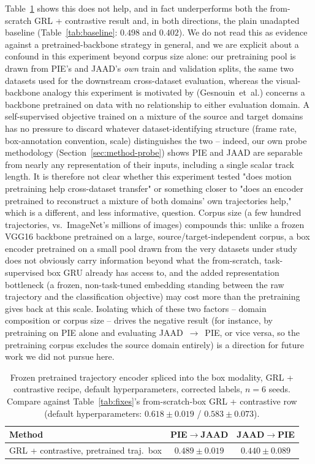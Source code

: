 Table~\ref{tab:pretrained-traj} shows this does not help, and in fact
underperforms both the from-scratch GRL + contrastive result and, in
both directions, the plain unadapted baseline
(Table~\ref{tab:baseline}: $0.498$ and $0.402$). We do not read this as
evidence against a pretrained-backbone strategy in general, and we are
explicit about a confound in this experiment beyond corpus size alone:
our pretraining pool is drawn from PIE's and JAAD's \emph{own} train
and validation splits, the same two datasets used for the downstream
cross-dataset evaluation, whereas the visual-backbone analogy this
experiment is motivated by (Gesnouin~et~al.) concerns a backbone
pretrained on data with no relationship to either evaluation
domain. A self-supervised objective trained on a mixture of the source
and target domains has no pressure to discard whatever
dataset-identifying structure (frame rate, box-annotation convention,
scale) distinguishes the two -- indeed, our own probe methodology
(Section~\ref{sec:method-probe}) shows PIE and JAAD are separable from
nearly any representation of their inputs, including a single scalar
track length. It is therefore not clear whether this experiment tested
"does motion pretraining help cross-dataset transfer" or something
closer to "does an encoder pretrained to reconstruct a mixture of both
domains' own trajectories help," which is a different, and less
informative, question. Corpus size (a few hundred trajectories, vs.\
ImageNet's millions of images) compounds this: unlike a frozen VGG16
backbone pretrained on a large, source/target-independent corpus, a box
encoder pretrained on a small pool drawn from the very datasets under
study does not obviously carry information beyond what the
from-scratch, task-supervised box GRU already has access to, and the
added representation bottleneck (a frozen, non-task-tuned embedding
standing between the raw trajectory and the classification objective)
may cost more than the pretraining gives back at this scale. Isolating
which of these two factors -- domain composition or corpus size --
drives the negative result (for instance, by pretraining on PIE alone
and evaluating JAAD~$\to$~PIE, or vice versa, so the pretraining
corpus excludes the source domain entirely) is a direction for future
work we did not pursue here.

\begin{table}[t]
\centering
\caption{Frozen pretrained trajectory encoder spliced into the box
modality, GRL + contrastive recipe, default hyperparameters, corrected
labels, $n=6$ seeds. Compare against Table~\ref{tab:fixes}'s
from-scratch-box GRL + contrastive row (default hyperparameters:
$0.618\pm0.019$ / $0.583\pm0.073$).}
\label{tab:pretrained-traj}
\begin{tabular}{lcc}
\toprule
Method & PIE$\to$JAAD & JAAD$\to$PIE \\
\midrule
GRL + contrastive, pretrained traj.\ box & $0.489\pm0.019$ & $0.440\pm0.089$ \\
\bottomrule
\end{tabular}
\end{table}

